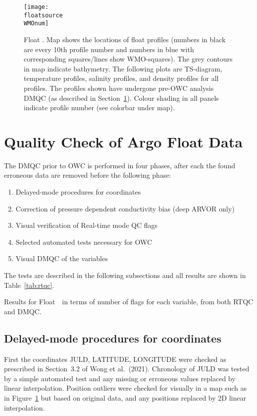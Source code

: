 \documentclass{article}
\begin{document}
\begin{figure}[H]
  \centerline{\texttt{[image: \\floatsource\\WMOnum]}}
  \caption{Float \WMOnum. Map shows the locations of float profiles (numbers in
    black are every 10th profile number and numbers in blue with
    corresponding squares/lines show WMO-squares). The grey contours in
    map indicate bathymetry. The following plots are TS-diagram,
    temperature profiles, salinity profiles, and density profiles for all
    profiles. The profiles shown have undergone pre-OWC analysis DMQC (as
    described in Section~\protect\ref{DMQCpreOWC}).  Colour shading in all  
    panels indicate profile number (see colorbar under map).}
  \label{fig:float-info}
\end{figure} 
 
        
\newpage
\section{Quality Check of Argo Float Data}\label{DMQCpreOWC}
%
The DMQC prior to OWC is performed in four phases, after each the found
erroneous data are removed before the following phase:
\begin{enumerate}
\item Delayed-mode procedures for coordinates
\item Correction of pressure dependent conductivity bias (deep ARVOR only)
\item Visual verification of Real-time mode QC flags
\item Selected automated tests necessary for OWC
\item Visual DMQC of the variables
\end{enumerate}
The tests are described in the following subsections and all results are shown in Table~\ref{tab:rtqc}. 

%
\begin{table}[!ht]
  \caption{Results for Float~\WMOnum\ in terms of number of flags for each variable, from both RTQC and DMQC.}
  \label{tab:rtqc}
  \centering
  
\end{table}     


\subsection{Delayed-mode procedures for coordinates}\label{sec:DM-coordinates}
First the coordinates JULD, LATITUDE, LONGITUDE were checked as prescribed
in Section~3.2 of Wong et al.~(2021).
%
Chronology of JULD was tested by a simple automated test and any missing
or erroneous values replaced by linear interpolation.
%
Position outliers were checked for visually in a map such as in
Figure~\ref{fig:float-info} but based on original data, and any positions
replaced by 2D linear interpolation.
\end{document}
